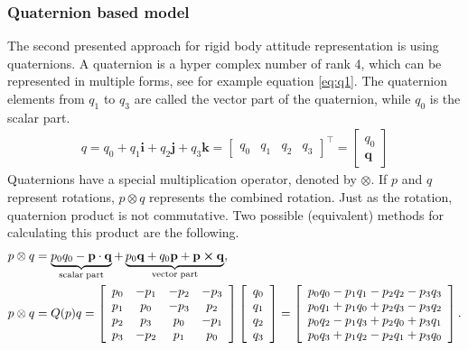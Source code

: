 \subsubsection{Quaternion based model}
The second presented approach for rigid body attitude representation is using quaternions. A quaternion is a hyper complex number of rank 4, which can be represented in multiple forms, see for example equation \eqref{eq:q1}. The quaternion elements from $q_1$ to $q_3$ are called the vector part of the quaternion, while $q_0$ is the scalar part.
\begin{align}
    q = q_0 + q_1\mathbf{i} + q_2\mathbf{j} + q_3\mathbf{k} = \begin{bmatrix}q_0 & q_1 &q_2& q_3 \end{bmatrix}^\top = \begin{bmatrix}q_0 \\ \mathbf{q} \end{bmatrix} \label{eq:q1}
\end{align}
Quaternions have a special multiplication operator, denoted by $\otimes$. If $p$ and $q$ represent rotations, $p\otimes q$ represents the combined rotation. Just as the rotation, quaternion product is not commutative. Two possible (equivalent) methods for calculating this product are the following.
\begin{align}
    p\otimes q &= \underbrace{p_0 q_0 - \mathbf{p}\cdot\mathbf{q}}_{\mathrm{scalar\; part}} +\underbrace{p_0 \mathbf{q} +q_0\mathbf{p} + \mathbf{p}\cross\mathbf{q}}_{\mathrm{vector\; part}},\\
    p\otimes q &= Q(p) q=\left[\begin{array}{cccc}
p_{0} & -p_{1} & -p_{2} & -p_{3} \\
p_{1} & p_{0} & -p_{3} & p_{2} \\
p_{2} & p_{3} & p_{0} & -p_{1} \\
p_{3} & -p_{2} & p_{1} & p_{0}
\end{array}\right]\left[\begin{array}{l}
q_{0} \\
q_{1} \\
q_{2} \\
q_{3}
\end{array}\right] = \left[\begin{array}{l}
p_{0} q_{0}-p_{1} q_{1}-p_{2} q_{2}-p_{3} q_{3} \\
p_{0} q_{1}+p_{1} q_{0}+p_{2} q_{3}-p_{3} q_{2} \\
p_{0} q_{2}-p_{1} q_{3}+p_{2} q_{0}+p_{3} q_{1} \\
p_{0} q_{3}+p_{1} q_{2}-p_{2} q_{1}+p_{3} q_{0}
\end{array}\right].
\end{align}


